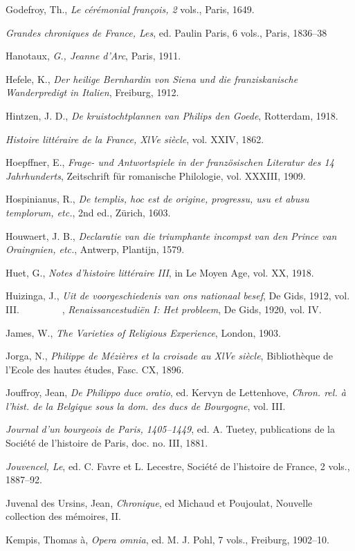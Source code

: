 Godefroy, Th., \emph{Le cérémonial françois, 2} vols., Paris, 1649.

\emph{Grandes chroniques de France, Les}, ed. Paulin Paris, 6 vols.,
Paris, 1836--38

Hanotaux, \emph{G., Jeanne d'Arc}, Paris, 1911.

Hefele, K., \emph{Der heilige Bernhardin von Siena und die
franziskanische Wanderpredigt in Italien}, Freiburg, 1912.

Hintzen, J. D., \emph{De kruistochtplannen van Philips den Goede},
Rotterdam, 1918.

\emph{Histoire littéraire de la France, XlVe siècle}, vol. XXIV, 1862.

Hoepffner, E., \emph{Frage- und Antwortspiele in der französischen
Literatur des 14 Jahrhunderts}, Zeitschrift für romanische Philologie,
vol. XXXIII, 1909.

Hospinianus, R., \emph{De templis, hoc est de origine, progressu, usu et
abusu templorum, etc.}, 2nd ed., Zürich, 1603.

Houwaert, J. B., \emph{Declaratie van die triumphante incompst van den
Prince van Oraingnien, etc.}, Antwerp, Plantijn, 1579.

Huet, G., \emph{Notes d'histoire littéraire III}, in Le Moyen Age, vol.
XX, 1918.

Huizinga, J., \emph{Uit de voorgeschiedenis van ons nationaal besef}, De
Gids, 1912, vol. III. \emph{{~~~~~~~~}}, \emph{Renaissancestudiën I: Het
probleem}, De Gids, 1920, vol. IV.

James, W., \emph{The Varieties of Religious Experience}, London, 1903.

Jorga, N., \emph{Philippe de Mézières et la croisade au XlVe siècle},
Bibliothèque de l'Ecole des hautes études, Fasc. CX, 1896.

Jouffroy, Jean, \emph{De Philippo duce oratio}, ed. Kervyn de
Lettenhove, \emph{Chron. rel. à l'hist. de la Belgique sous la dom. des
ducs de Bourgogne}, vol. III.

\emph{Journal d'un bourgeois de Paris, 1405--1449}, ed. A. Tuetey,
publications de la Société de l'histoire de Paris, doc. no. III, 1881.

\emph{Jouvencel, Le}, ed. C. Favre et L. Lecestre, Société de l'histoire
de France, 2 vols., 1887--92.

Juvenal des Ursins, Jean, \emph{Chronique}, ed Michaud et Poujoulat,
Nouvelle collection des mémoires, II.

Kempis, Thomas à, \emph{Opera omnia}, ed. M. J. Pohl, 7 vols., Freiburg,
1902--10.

